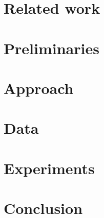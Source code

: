 \documentclass[sigconf]{acmart}
\begin{document}
\section{Related work}


\section{Preliminaries}


\section{Approach}


\section{Data}


\section{Experiments}


\section{Conclusion}

\end{document}
